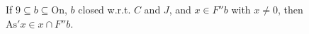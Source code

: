 If $9 \subseteq b \subseteq \mathrm{On}$, $b$ closed w.r.t. $C$ and $J$, and $x \in F''b$ with $x \neq 0$, then $\mathrm{As}' x \in x \cap F''b$.
